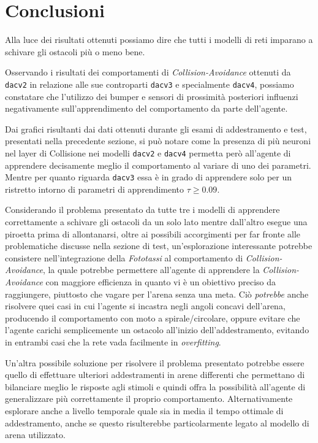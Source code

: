 \section{Conclusioni}

Alla luce dei risultati ottenuti possiamo dire che tutti i modelli di reti imparano a schivare gli ostacoli più o meno bene. 

Osservando i risultati dei comportamenti di \textit{Collision-Avoidance} ottenuti da \texttt{dacv2} in relazione alle sue controparti \texttt{dacv3} e specialmente \texttt{dacv4}, possiamo constatare che l'utilizzo dei bumper e sensori di prossimità posteriori influenzi negativamente sull'apprendimento del comportamento da parte dell'agente. 

Dai grafici risultanti dai dati ottenuti durante gli esami di addestramento e test, presentati nella precedente sezione, si può notare come la presenza di più neuroni nel layer di Collisione nei modelli \texttt{dacv2} e \texttt{dacv4} permetta però all'agente di apprendere decisamente meglio il comportamento al variare di uno dei parametri. Mentre per quanto riguarda \texttt{dacv3} essa è in grado di apprendere solo per un ristretto intorno di parametri di apprendimento $\tau \ge 0.09$.

Considerando il problema presentato da tutte tre i modelli di apprendere correttamente a schivare gli ostacoli da un solo lato mentre dall'altro esegue una piroetta prima di allontanarsi, oltre ai possibili accorgimenti per far fronte alle problematiche discusse nella sezione di test, un'esplorazione interessante potrebbe consistere nell'integrazione della \textit{Fototassi} al comportamento di \textit{Collision-Avoidance}, la quale potrebbe permettere all'agente di apprendere la \textit{Collision-Avoidance} con maggiore efficienza in quanto vi è un obiettivo preciso da raggiungere, piuttosto che vagare per l'arena senza una meta. Ciò \textit{potrebbe} anche risolvere quei casi in cui l'agente si incastra negli angoli concavi dell'arena, producendo il comportamento con moto a spirale/circolare, oppure evitare che l'agente carichi semplicemente un ostacolo all'inizio dell'addestramento, evitando in entrambi casi che la rete vada facilmente in \textit{overfitting}.

Un'altra possibile soluzione per risolvere il problema presentato potrebbe essere quello di effettuare ulteriori addestramenti in arene differenti che permettano di bilanciare meglio le risposte agli stimoli e quindi offra la possibilità all'agente di generalizzare più correttamente il proprio comportamento. 
Alternativamente esplorare anche a livello temporale quale sia in media il tempo ottimale di addestramento, anche se questo risulterebbe particolarmente legato al modello di arena utilizzato.


